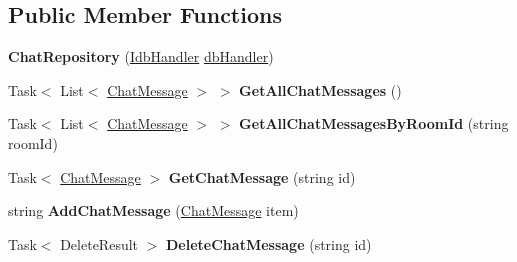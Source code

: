 \subsection*{Public Member Functions}
\begin{DoxyCompactItemize}
\item 
\hypertarget{class_wis_r_rest_a_p_i_1_1_providers_1_1_chat_repository_a60baba958292950c80b98444c3e042dc}{}{\bfseries Chat\+Repository} (\hyperlink{interface_wis_r_rest_a_p_i_1_1_domain_model_1_1_idb_handler}{Idb\+Handler} \hyperlink{class_wis_r_rest_a_p_i_1_1_domain_model_1_1db_handler}{db\+Handler})\label{class_wis_r_rest_a_p_i_1_1_providers_1_1_chat_repository_a60baba958292950c80b98444c3e042dc}

\item 
\hypertarget{class_wis_r_rest_a_p_i_1_1_providers_1_1_chat_repository_aa154217c8f017ecd22566e22be86ab6e}{}Task$<$ List$<$ \hyperlink{class_wis_r_1_1_domain_model_1_1_chat_message}{Chat\+Message} $>$ $>$ {\bfseries Get\+All\+Chat\+Messages} ()\label{class_wis_r_rest_a_p_i_1_1_providers_1_1_chat_repository_aa154217c8f017ecd22566e22be86ab6e}

\item 
\hypertarget{class_wis_r_rest_a_p_i_1_1_providers_1_1_chat_repository_ae638f51682f640bf4b975aef4bb9c971}{}Task$<$ List$<$ \hyperlink{class_wis_r_1_1_domain_model_1_1_chat_message}{Chat\+Message} $>$ $>$ {\bfseries Get\+All\+Chat\+Messages\+By\+Room\+Id} (string room\+Id)\label{class_wis_r_rest_a_p_i_1_1_providers_1_1_chat_repository_ae638f51682f640bf4b975aef4bb9c971}

\item 
\hypertarget{class_wis_r_rest_a_p_i_1_1_providers_1_1_chat_repository_aa3cb29196ebe37bafa6996a1f6399c0a}{}Task$<$ \hyperlink{class_wis_r_1_1_domain_model_1_1_chat_message}{Chat\+Message} $>$ {\bfseries Get\+Chat\+Message} (string id)\label{class_wis_r_rest_a_p_i_1_1_providers_1_1_chat_repository_aa3cb29196ebe37bafa6996a1f6399c0a}

\item 
\hypertarget{class_wis_r_rest_a_p_i_1_1_providers_1_1_chat_repository_a872829be2a30627a5cea4713f1176c5e}{}string {\bfseries Add\+Chat\+Message} (\hyperlink{class_wis_r_1_1_domain_model_1_1_chat_message}{Chat\+Message} item)\label{class_wis_r_rest_a_p_i_1_1_providers_1_1_chat_repository_a872829be2a30627a5cea4713f1176c5e}

\item 
\hypertarget{class_wis_r_rest_a_p_i_1_1_providers_1_1_chat_repository_ac9eb087e161f626754973a2a92370f87}{}Task$<$ Delete\+Result $>$ {\bfseries Delete\+Chat\+Message} (string id)\label{class_wis_r_rest_a_p_i_1_1_providers_1_1_chat_repository_ac9eb087e161f626754973a2a92370f87}


\end{DoxyCompactItemize}
